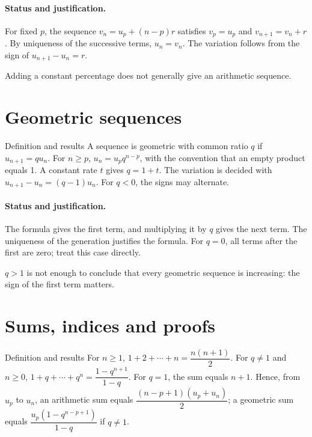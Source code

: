 \paragraph{Status and justification.} For fixed $p$, the sequence $v_n=u_p+(n-p)r$ satisfies $v_p=u_p$ and $v_{n+1}=v_n+r$. By uniqueness of the successive terms, $u_n=v_n$. The variation follows from the sign of $u_{n+1}-u_n=r$.
\label{C01-EX2}
\begin{erreur}Adding a constant percentage does not generally give an arithmetic sequence.\end{erreur}
\label{C01-AP2}
\section{Geometric sequences}\label{C01-U3}
\begin{repere}{Definition and results}
A sequence is geometric with common ratio $q$ if $u_{n+1}=qu_n$. For $n\geq p$, $u_n=u_pq^{n-p}$, with the convention that an empty product equals 1. A constant rate $t$ gives $q=1+t$. The variation is decided with $u_{n+1}-u_n=(q-1)u_n$. For $q<0$, the signs may alternate.
\end{repere}
\paragraph{Status and justification.} The formula gives the first term, and multiplying it by $q$ gives the next term. The uniqueness of the generation justifies the formula. For $q=0$, all terms after the first are zero; treat this case directly.
\label{C01-EX3}
\begin{erreur}$q>1$ is not enough to conclude that every geometric sequence is increasing: the sign of the first term matters.\end{erreur}
\label{C01-AP3}
\section{Sums, indices and proofs}\label{C01-U4}
\begin{repere}{Definition and results}
For $n\geq1$, $1+2+\cdots +n=\dfrac{n(n+1)}{2}$. For $q\ne1$ and $n\geq0$, $1+q+\cdots +q^n=\dfrac{1-q^{n+1}}{1-q}$. For $q=1$, the sum equals $n+1$. Hence, from $u_p$ to $u_n$, an arithmetic sum equals $\dfrac{(n-p+1)(u_p+u_n)}{2}$; a geometric sum equals $\dfrac{u_p(1-q^{n-p+1})}{1-q}$ if $q\ne1$.
\end{repere}

